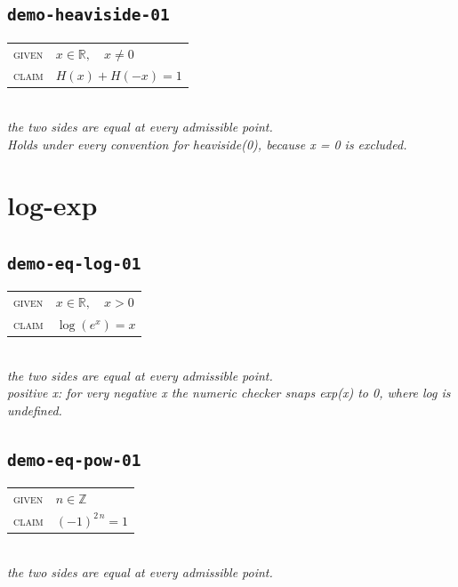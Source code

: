 \documentclass[11pt]{article}
\begin{document}
\subsection*{\texttt{demo-heaviside-01}}
\begin{tabular}{@{}l@{\quad}l@{}}
\textsc{given} & $x \in \mathbb{R},\quad x \neq 0$ \\[4pt]
\textsc{claim} & $\displaystyle H\left(x\right) + H\left(-x\right) = 1$ \\
\end{tabular}\\[2pt]
{\small\emph{the two sides are equal at every admissible point.}}\\
\emph{Holds under every convention for heaviside(0), because x = 0 is excluded.}\\

\section*{log-exp}
\subsection*{\texttt{demo-eq-log-01}}
\begin{tabular}{@{}l@{\quad}l@{}}
\textsc{given} & $x \in \mathbb{R},\quad x > 0$ \\[4pt]
\textsc{claim} & $\displaystyle \log\left(e^{x}\right) = x$ \\
\end{tabular}\\[2pt]
{\small\emph{the two sides are equal at every admissible point.}}\\
\emph{positive x: for very negative x the numeric checker snaps exp(x) to 0, where log is undefined.}\\

\subsection*{\texttt{demo-eq-pow-01}}
\begin{tabular}{@{}l@{\quad}l@{}}
\textsc{given} & $n \in \mathbb{Z}$ \\[4pt]
\textsc{claim} & $\displaystyle \left(-1\right)^{2 \, n} = 1$ \\
\end{tabular}\\[2pt]
{\small\emph{the two sides are equal at every admissible point.}}\\
\end{document}
